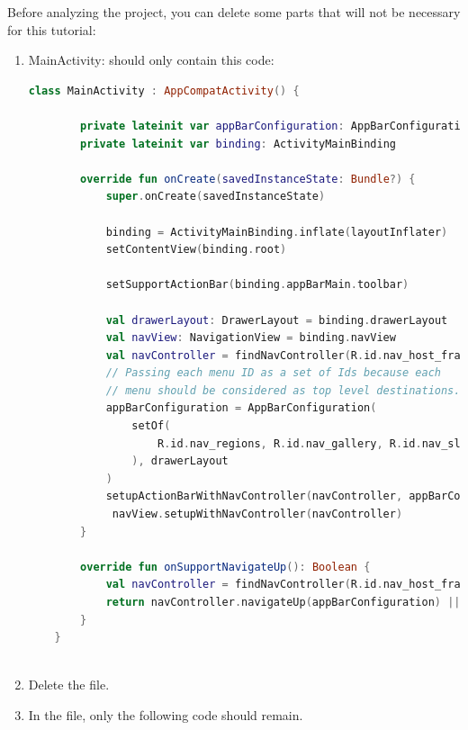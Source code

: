 \documentclass[a4paper, 12pt]{article}
\begin{document}
Before analyzing the project, you can delete some parts that will not be necessary for this tutorial:

\begin{enumerate}
    \item MainActivity: should only contain this code:

    \begin{lstlisting}[caption={Activity Main code.}, label={code:activity_main}, language=Kotlin]
        class MainActivity : AppCompatActivity() {

        private lateinit var appBarConfiguration: AppBarConfiguration
        private lateinit var binding: ActivityMainBinding
    
        override fun onCreate(savedInstanceState: Bundle?) {
            super.onCreate(savedInstanceState)
    
            binding = ActivityMainBinding.inflate(layoutInflater)
            setContentView(binding.root)
    
            setSupportActionBar(binding.appBarMain.toolbar)
    
            val drawerLayout: DrawerLayout = binding.drawerLayout
            val navView: NavigationView = binding.navView
            val navController = findNavController(R.id.nav_host_fragment_content_main)
            // Passing each menu ID as a set of Ids because each
            // menu should be considered as top level destinations.
            appBarConfiguration = AppBarConfiguration(
                setOf(
                    R.id.nav_regions, R.id.nav_gallery, R.id.nav_slideshow, R.id.nav_home
                ), drawerLayout
            )
            setupActionBarWithNavController(navController, appBarConfiguration)
             navView.setupWithNavController(navController)
        }
    
        override fun onSupportNavigateUp(): Boolean {
            val navController = findNavController(R.id.nav_host_fragment_content_main)
            return navController.navigateUp(appBarConfiguration) || super.onSupportNavigateUp()
        }
    }
    
\end{lstlisting}

    \item  Delete the \texttt{} file.
    
    \item In the \texttt{} file, only the following code should remain.
    


\end{enumerate}
\end{document}

